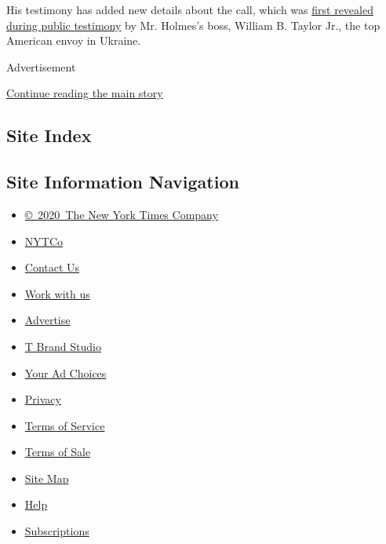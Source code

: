 His testimony has added new details about the call, which was
\href{https://www.nytimes.com/2019/11/13/us/politics/impeachment-hearing-day-1.html}{first
revealed during public testimony} by Mr. Holmes's boss, William B.
Taylor Jr., the top American envoy in Ukraine.

Advertisement

\protect\hyperlink{after-bottom}{Continue reading the main story}

\hypertarget{site-index}{%
\subsection{Site Index}\label{site-index}}

\hypertarget{site-information-navigation}{%
\subsection{Site Information
Navigation}\label{site-information-navigation}}

\begin{itemize}
\tightlist
\item
  \href{https://help.nytimes.com/hc/en-us/articles/115014792127-Copyright-notice}{©~2020~The
  New York Times Company}
\end{itemize}

\begin{itemize}
\tightlist
\item
  \href{https://www.nytco.com/}{NYTCo}
\item
  \href{https://help.nytimes.com/hc/en-us/articles/115015385887-Contact-Us}{Contact
  Us}
\item
  \href{https://www.nytco.com/careers/}{Work with us}
\item
  \href{https://nytmediakit.com/}{Advertise}
\item
  \href{http://www.tbrandstudio.com/}{T Brand Studio}
\item
  \href{https://www.nytimes.com/privacy/cookie-policy\#how-do-i-manage-trackers}{Your
  Ad Choices}
\item
  \href{https://www.nytimes.com/privacy}{Privacy}
\item
  \href{https://help.nytimes.com/hc/en-us/articles/115014893428-Terms-of-service}{Terms
  of Service}
\item
  \href{https://help.nytimes.com/hc/en-us/articles/115014893968-Terms-of-sale}{Terms
  of Sale}
\item
  \href{https://spiderbites.nytimes.com}{Site Map}
\item
  \href{https://help.nytimes.com/hc/en-us}{Help}
\item
  \href{https://www.nytimes.com/subscription?campaignId=37WXW}{Subscriptions}
\end{itemize}

